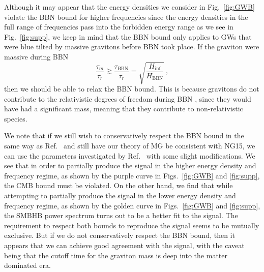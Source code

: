 \documentclass[prd,twocolumn,aps,psfig,nofootinbib,nobibnotes,superscriptaddress,preprintnumbers,times]{revtex4-2}
\begin{document}
Although it may appear that the energy densities we consider in Fig.\ \ref{fig:GWB} violate the BBN bound for higher frequencies since the energy densities in the full range of frequencies pass into the forbidden energy range as we see in Fig.\ \ref{fig:supp}, we keep in mind that the BBN bound only applies to GWs that were blue tilted by massive gravitons before BBN took place. If the graviton were massive during BBN 
\begin{equation}\label{eqn:massive_bbn}
    \frac{\tau_m}{\tau_r} \gtrsim \frac{\tau_{\text{BBN}}}{\tau_r} = \sqrt{\frac{H_{\inf}}{H_{\text{BBN}}}}\ ,
\end{equation}
then we should be able to relax the BBN bound. This is because gravitons do not contribute to the relativistic degrees of freedom during BBN \cite{Fujita:2018ehq}, since they would have had a significant mass, meaning that they contribute to non-relativistic species.

We note that if we still wish to conservatively respect the BBN bound in the same way as Ref.\ \cite{Fujita:2018ehq} and still have our theory of MG be consistent with NG15, we can use the parameters investigated by Ref.\ \cite{Fujita:2018ehq} with some slight modifications. We see that in order to partially produce the signal in the higher energy density and frequency regime, as shown by the purple curve in Figs.\ \ref{fig:GWB} and \ref{fig:supp}, the CMB bound must be violated. On the other hand, we find that while attempting to partially produce the signal in the lower energy density and frequency regime, as shown by the golden curve in Figs.\ \ref{fig:GWB} and \ref{fig:supp}, the SMBHB power spectrum turns out to be a better fit to the signal. The requirement to respect both bounds to reproduce the signal seems to be mutually exclusive. But if we do not conservatively respect the BBN bound, then it appears that we can achieve good agreement with the signal, with the caveat being that the cutoff time for the graviton mass is deep into the matter dominated era.
\end{document}
